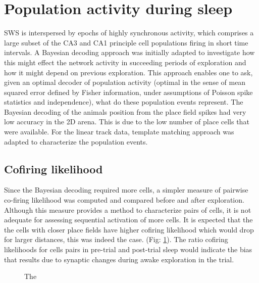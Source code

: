 \section{Population activity during sleep}

SWS is interspersed by epochs of highly synchronous activity, which comprises a large subset of the CA3 and CA1 principle cell populations firing in short time intervals. A Bayesian decoding approach was initially adapted to investigate how this might effect the network activity in succeeding periods of exploration and how it might depend on previous exploration. This approach enables one to ask, given an optimal decoder of population activity (optimal in the sense of mean squared error defined by Fisher information, under assumptions of Poisson spike statistics  and independence), what do these population events represent. The Bayesian decoding of the animals position from the place field spikes had very low accuracy in the 2D arena. This is due to the low number of place cells that were available. For the linear track data, template matching approach was adapted to characterize the population events. 

\subsection{Cofiring likelihood}
Since the Bayesian decoding required more cells, a simpler measure of pairwise co-firing likelihood was computed and compared before and after exploration. Although this measure provides a method to characterize pairs of cells, it is not adequate for assessing sequential activation of more cells. It is expected that the the cells with closer place fields have higher cofiring likelihood which would drop for larger distances, this was indeed the case. (Fig: \ref{fig:cfvsdist}). The ratio cofiring likelihoods for cells pairs in pre-trial and post-trial sleep would indicate the bias that results due to synaptic changes during awake exploration in the trial.
\begin{figure}[htb!]
\centering
{}
\caption[Pairwise cofiring]{The }
\label{fig:cfvsdist}
\end{figure}

